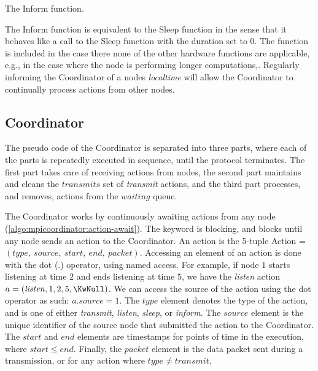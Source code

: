 \begin{algorithm}[ht]
    \DontPrintSemicolon
    
    
    \caption{The Inform function.}
    \label{algo:hwfuncsupdatelocaltime}
\end{algorithm}

The Inform function is equivalent to the Sleep function in the sense that it behaves like a call to the Sleep
function with the duration set to 0. The function is included in the case there none of the other hardware
functions are applicable, e.g., in the case where the node is performing longer computations,. Regularly
informing the Coordinator of a nodes \textit{localtime} will allow the Coordinator to continually process actions from
other nodes.

\subsection{Coordinator}\label{sec:coordinatorpseudo}
The pseudo code of the Coordinator is separated into three parts, where each of the parts is repeatedly
executed in sequence, until the protocol terminates. The first part takes care of receiving actions from
nodes, the second part maintains and cleans the $\mathit{transmits}$ set of \textit{transmit} actions, and the
third part processes, and removes, actions from the $\mathit{waiting}$ queue. \medbreak

The Coordinator works by continuously awaiting actions from any node
(\autoref{algo:mpicoordinator:action-await}). The \KwAwait keyword is blocking, and blocks until any node
sends an action to the Coordinator. An action is the 5-tuple Action = $(\mathit{type},\ \mathit{source},\
\mathit{start},\ \mathit{end},\ \mathit{packet})$. Accessing an element of an action is done with the dot
($.$) operator, using named access. For example, if node $1$ starts listening at time $2$ and ends listening
at time $5$, we have the \textit{listen} action $a = (\mathit{listen}, 1, 2, 5, \KwNull)$. We can access the
source of the action using the dot operator as such: $a.source = 1$. The $\mathit{type}$ element denotes the
type of the action, and is one of either \textit{transmit}, \textit{listen}, \textit{sleep}, or
\textit{inform}. The $\mathit{source}$ element is the unique identifier of the source node that submitted the
action to the Coordinator. The $\mathit{start}$ and $\mathit{end}$ elements are timestamps for points of time
in the execution, where $\mathit{start} \leq \mathit{end}$. Finally, the $\mathit{packet}$ element is the data
packet sent during a transmission, or \KwNull for any action where $\mathit{type} \neq \mathit{transmit}$.
\medbreak

